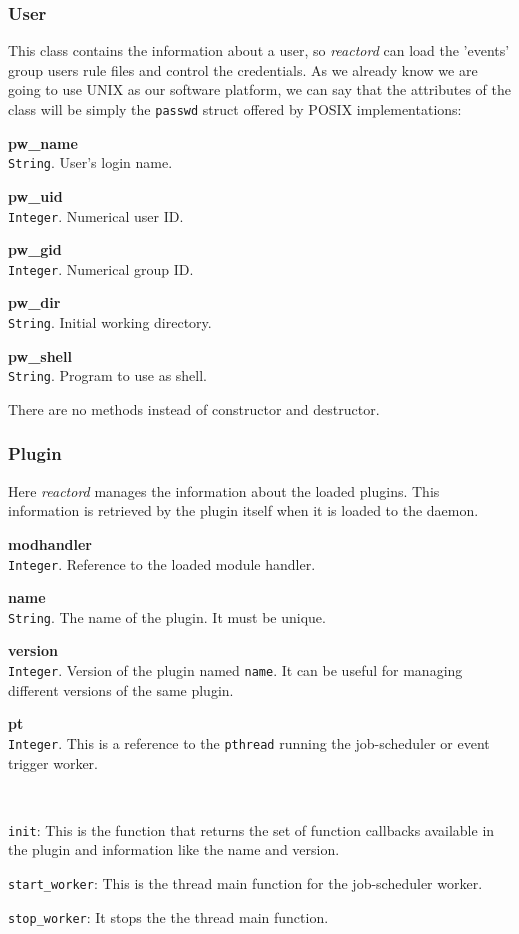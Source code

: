 \subsubsection{User}
This class contains the information about a user, so \emph{reactord} can load the 'events' group users rule files and control the 
credentials. As we already know we are going to use UNIX as our software platform, we can say that the attributes of the class will be 
simply the \texttt{passwd} struct offered by POSIX implementations\cite{og:pwdh}:
\begin{list}{-}{}
  \item {\bf pw\_name}\\
    \texttt{String}. User's login name.
  \item {\bf pw\_uid}\\
    \texttt{Integer}. Numerical user ID.
  \item {\bf pw\_gid}\\
    \texttt{Integer}. Numerical group ID. 
  \item {\bf pw\_dir}\\
    \texttt{String}. Initial working directory.
  \item {\bf pw\_shell}\\
    \texttt{String}. Program to use as shell.
\end{list}
There are no methods instead of constructor and destructor.
\subsubsection{Plugin}
Here \emph{reactord} manages the information about the loaded plugins. This information is retrieved by the plugin itself when it is
loaded to the daemon.
\begin{list}{-}{The attributes are:}
  \item {\bf modhandler}\\
    \texttt{Integer}. Reference to the loaded module handler.
  \item {\bf name}\\
    \texttt{String}. The name of the plugin. It must be unique.
  \item {\bf version}\\
    \texttt{Integer}. Version of the plugin named \texttt{name}. It can be useful for managing different versions of the same plugin.
  \item {\bf pt}\\
    \texttt{Integer}. This is a reference to the \texttt{pthread} running the job-scheduler or event trigger worker.
\end{list}
~
\begin{list}{-}{By now, the methods are:}
  \item \texttt{init}:
    This is the function that returns the set of function callbacks available in the plugin and information like the name and version.
  \item \texttt{start\_worker}:
    This is the thread main function for the job-scheduler worker.
  \item \texttt{stop\_worker}:
    It stops the the thread main function.
\end{list}
